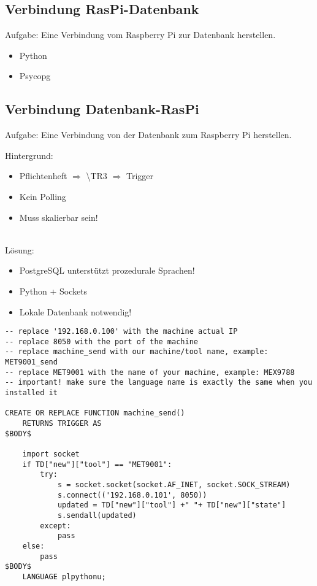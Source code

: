 \documentclass[ignorenonframetext, 11pt, table]{beamer}
\begin{document}
\subsection{Verbindung RasPi-Datenbank}
\begin{frame}
Aufgabe: Eine Verbindung vom Raspberry Pi zur Datenbank herstellen.\newline\pause

\begin{itemize}
\item Python\pause
\item Psycopg
\end{itemize}
\end{frame}

\subsection{Verbindung Datenbank-RasPi}
\begin{frame}
Aufgabe: Eine Verbindung von der Datenbank zum Raspberry Pi herstellen.\newline\pause

Hintergrund:\pause
\begin{itemize}
\item Pflichtenheft $\Rightarrow$ \textbackslash TR3 $\Rightarrow$ Trigger\pause
\item Kein Polling\pause
\item Muss skalierbar sein!\pause
\end{itemize}
~\\
Lösung:\pause
\begin{itemize}
\item PostgreSQL unterstützt prozedurale Sprachen!\pause
\item Python + Sockets\pause
\item Lokale Datenbank notwendig!
\end{itemize}
\end{frame}

\begin{frame}[fragile]
\begin{lstlisting}[label=trigger-func, basicstyle=\tiny]
-- replace '192.168.0.100' with the machine actual IP
-- replace 8050 with the port of the machine 
-- replace machine_send with our machine/tool name, example: MET9001_send
-- replace MET9001 with the name of your machine, example: MEX9788
-- important! make sure the language name is exactly the same when you installed it

CREATE OR REPLACE FUNCTION machine_send()  
    RETURNS TRIGGER AS
$BODY$

    import socket
    if TD["new"]["tool"] == "MET9001": 
        try:
            s = socket.socket(socket.AF_INET, socket.SOCK_STREAM)
            s.connect(('192.168.0.101', 8050)) 
            updated = TD["new"]["tool"] +" "+ TD["new"]["state"]
            s.sendall(updated)
        except:
            pass
    else:
        pass
$BODY$
    LANGUAGE plpythonu;
\end{lstlisting}
\end{frame}
\end{document}
